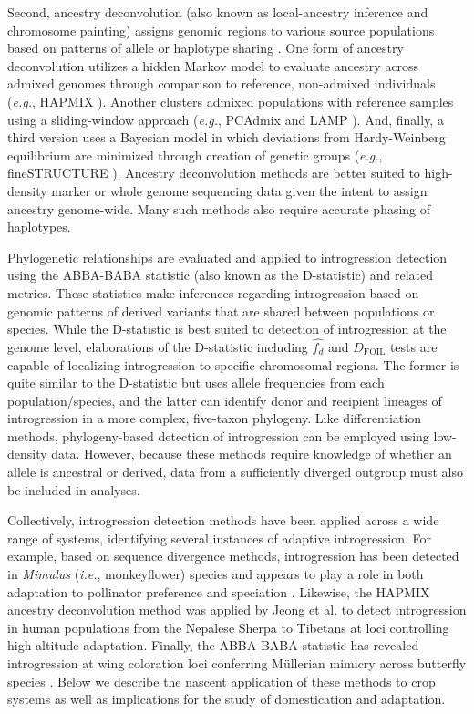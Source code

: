 \documentclass[11pt]{article}
\begin{document}
Second, ancestry deconvolution (also known as local-ancestry inference and chromosome painting) assigns genomic regions to various source populations based on patterns of allele or haplotype sharing \cite{schraiber2015}. 
One form of ancestry deconvolution utilizes a hidden Markov model to evaluate ancestry across admixed genomes through comparison to reference, non-admixed individuals (\emph{e.g.}, HAPMIX \cite{Price2009}). 
Another clusters admixed populations with reference samples using a sliding-window approach (\emph{e.g.}, PCAdmix \cite{brisbin2012pcadmix} and LAMP \cite{sankararaman2008}).
And, finally, a third version uses a Bayesian model \cite{pritchard2000} in which deviations from Hardy-Weinberg equilibrium are minimized through creation of genetic groups (\emph{e.g.}, fineSTRUCTURE \cite{Lawson2012}).
Ancestry deconvolution methods are better suited to high-density marker or whole genome sequencing data given the intent to assign ancestry genome-wide.
Many such methods also require accurate phasing of haplotypes.

Phylogenetic relationships are evaluated and applied to introgression detection using the ABBA-BABA statistic (also known as the D-statistic) and related metrics.
These statistics make inferences regarding introgression based on genomic patterns of derived variants that are shared between populations or species.
While the D-statistic is best suited to detection of introgression at the genome level, elaborations of the D-statistic including $\hat{f_{d}}$ \cite{martin2015} and $D_{\textrm{FOIL}}$ tests \cite{pease2015} are capable of localizing introgression to specific chromosomal regions. 
The former is quite similar to the D-statistic but uses allele frequencies from each population/species, and the latter can identify donor and recipient lineages of introgression in a more complex, five-taxon phylogeny.
Like differentiation methods, phylogeny-based detection of introgression can be employed using low-density data.
However, because these methods require knowledge of whether an allele is ancestral or derived, data from a sufficiently diverged outgroup must also be included in analyses.

Collectively, introgression detection methods have been applied across a wide range of systems, identifying several instances of adaptive introgression.
For example, based on sequence divergence methods, introgression has been detected in \emph{Mimulus} (\emph{i.e.}, monkeyflower) species and appears to play a role in both adaptation to pollinator preference and speciation \cite{Stankowski2015}.
Likewise, the HAPMIX ancestry deconvolution method was applied by Jeong et al. \cite{jeong2014} to detect introgression in human populations from the Nepalese Sherpa to Tibetans at loci controlling high altitude adaptation.
Finally, the ABBA-BABA statistic has revealed introgression at wing coloration loci conferring M\"{u}llerian mimicry across butterfly species \cite{heliconius2012}.
Below we describe the nascent application of these methods to crop systems as well as implications for the study of domestication and adaptation.
\end{document}
